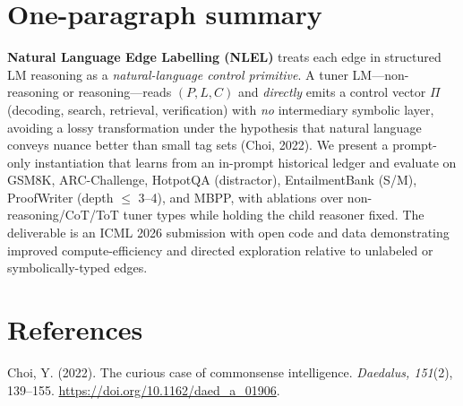 \documentclass[11pt]{article}
\begin{document}
\section*{One-paragraph summary}
\textbf{Natural Language Edge Labelling (NLEL)} treats each edge in structured LM reasoning as a \emph{natural-language control primitive}. A tuner LM---non-reasoning or reasoning---reads $(P,L,C)$ and \emph{directly} emits a control vector $\Pi$ (decoding, search, retrieval, verification) with \emph{no} intermediary symbolic layer, avoiding a lossy transformation under the hypothesis that natural language conveys nuance better than small tag sets (Choi, 2022). We present a prompt-only instantiation that learns from an in-prompt historical ledger and evaluate on GSM8K, ARC-Challenge, HotpotQA (distractor), EntailmentBank (S/M), ProofWriter (depth $\le$ 3--4), and MBPP, with ablations over non-reasoning/CoT/ToT tuner types while holding the child reasoner fixed. The deliverable is an ICML 2026 submission with open code and data demonstrating improved compute-efficiency and directed exploration relative to unlabeled or symbolically-typed edges.

\section*{References}
\noindent Choi, Y. (2022). The curious case of commonsense intelligence. \emph{Daedalus, 151}(2), 139--155. \href{https://doi.org/10.1162/daed_a_01906}{https://doi.org/10.1162/daed\_a\_01906}.
\end{document}
